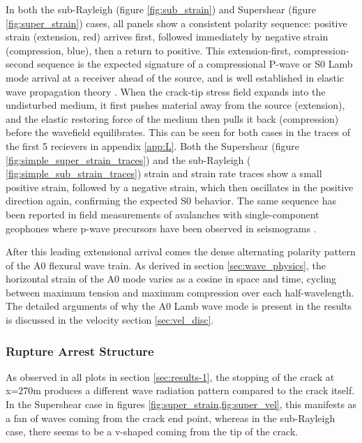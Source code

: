 In both the sub-Rayleigh (figure \ref{fig:sub_strain}) and Supershear
(figure \ref{fig:super_strain}) cases, all panels show a consistent polarity sequence: positive strain (extension, red) arrives first, followed immediately by negative strain (compression, blue), then a return to positive. This extension-first, compression-second sequence is the expected signature of a compressional P-wave or S0 Lamb mode arrival at a receiver ahead of the source, and is well established in elastic wave propagation theory \parencite{kAkiRichards19801981}. When the crack-tip stress field expands into the undisturbed medium, it first pushes material away from the source (extension), and the elastic restoring force of the medium then pulls it back (compression) before the wavefield equilibrates. This can be seen for both cases in the traces of the first 5 recievers in appendix \ref{app:L}. Both the Supershear (figure \ref{fig:simple_super_strain_traces}) and the sub-Rayleigh ( \ref{fig:simple_sub_strain_traces}) strain and strain rate traces show a small positive strain, followed by a negative strain, which then oscillates in the positive direction again, confirming the expected S0 behavior. The same sequence has been reported in field measurements of avalanches with single-component geophones where p-wave precursors have been observed in seismograms
\parencite{herwijnenSeismicSensorArray2011}. \par

After this leading extensional arrival comes the dense alternating polarity pattern of the A0 flexural wave train. As derived in section \ref{sec:wave_physics}, the horizontal strain of the A0 mode varies as a cosine in space and time, cycling between maximum tension and maximum compression over each half-wavelength. The detailed arguments of why the A0 Lamb wave mode is present in the results is discussed in the velocity section \ref{sec:vel_disc}. \par

\subsubsection{Rupture Arrest Structure}
As observed in all plots in section \ref{sec:results-1}, the stopping of the crack at x=270m produces a different wave radiation pattern compared to the crack itself. In the Supershear case in figures \ref{fig:super_strain,fig:super_vel}, this manifests as a fan of waves coming from the crack end point, whereas in the sub-Rayleigh case, there seems to be a v-shaped coming from the tip of the crack. \par

